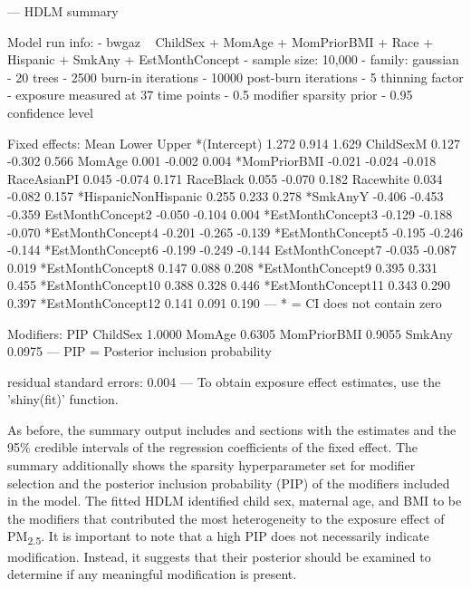\begin{example}
---
HDLM summary

Model run info:
- bwgaz ~ ChildSex + MomAge + MomPriorBMI + Race + Hispanic + SmkAny + EstMonthConcept
- sample size: 10,000
- family: gaussian
- 20 trees
- 2500 burn-in iterations
- 10000 post-burn iterations
- 5 thinning factor
- exposure measured at 37 time points
- 0.5 modifier sparsity prior
- 0.95 confidence level

Fixed effects:
                       Mean  Lower  Upper
*(Intercept)          1.272  0.914  1.629
 ChildSexM            0.127 -0.302  0.566
 MomAge               0.001 -0.002  0.004
*MomPriorBMI         -0.021 -0.024 -0.018
 RaceAsianPI          0.045 -0.074  0.171
 RaceBlack            0.055 -0.070  0.182
 Racewhite            0.034 -0.082  0.157
*HispanicNonHispanic  0.255  0.233  0.278
*SmkAnyY             -0.406 -0.453 -0.359
 EstMonthConcept2    -0.050 -0.104  0.004
*EstMonthConcept3    -0.129 -0.188 -0.070
*EstMonthConcept4    -0.201 -0.265 -0.139
*EstMonthConcept5    -0.195 -0.246 -0.144
*EstMonthConcept6    -0.199 -0.249 -0.144
 EstMonthConcept7    -0.035 -0.087  0.019
*EstMonthConcept8     0.147  0.088  0.208
*EstMonthConcept9     0.395  0.331  0.455
*EstMonthConcept10    0.388  0.328  0.446
*EstMonthConcept11    0.343  0.290  0.397
*EstMonthConcept12    0.141  0.091  0.190
---
* = CI does not contain zero

Modifiers:
               PIP
ChildSex    1.0000
MomAge      0.6305
MomPriorBMI 0.9055
SmkAny      0.0975
---
PIP = Posterior inclusion probability

residual standard errors: 0.004
---
To obtain exposure effect estimates, use the 'shiny(fit)' function.
\end{example}

As before, the summary output includes  and  sections with the estimates and the 95\% credible intervals of the regression coefficients of the fixed effect. The summary additionally shows the sparsity hyperparameter set for modifier selection and the posterior inclusion probability (PIP) of the modifiers included in the model. The fitted HDLM identified child sex, maternal age, and BMI to be the modifiers that contributed the most heterogeneity to the exposure effect of PM\textsubscript{2.5}. It is important to note that a high PIP does not necessarily indicate modification. Instead, it suggests that their posterior should be examined to determine if any meaningful modification is present.

